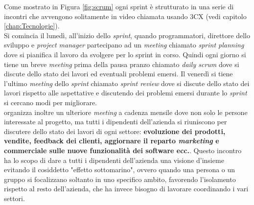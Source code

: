 Come mostrato in Figura \ref{fig:scrum} ogni sprint è strutturato in una serie di incontri che avvengono solitamente in video chiamata usando 
3CX (vedi capitolo \ref{chap:Tecnologie}).\\ 
Si comincia il lunedì, all'inizio dello \textit{sprint}, quando programmatori, direttore dello sviluppo e \textit{project manager} partecipano 
ad un \textit{meeting} chiamato \textit{sprint planning} dove si pianifica il lavoro da svolgere per lo sprint in corso.
Quindi ogni giorno si tiene un breve \textit{meeting} prima della pausa pranzo chiamato \textit{daily scrum} dove si discute dello stato dei lavori ed 
eventuali problemi emersi.
Il venerdì si tiene l'ultimo \textit{meeting} dello \textit{sprint} chiamato \textit{sprint review} dove si discute 
dello stato dei lavori rispetto alle aspettative e discutendo dei problemi emersi durante lo \textit{sprint} si cercano modi per migliorare.\\
{\company} organizza inoltre un ulteriore \textit{meeting} a cadenza mensile dove non solo le persone interessate al progetto, ma tutti i dipendenti dell'azienda 
si riuniscono per discutere dello stato dei lavori di ogni settore: \textbf{evoluzione dei prodotti, vendite, feedback dei clienti, aggiornare il reparto \textit{marketing}
 e commerciale sulle nuove funzionalità dei software ecc.}. Questo incontro ha 
lo scopo di dare a tutti i dipendenti dell'azienda una visione d'insieme evitando il cosiddetto "effetto sottomarino", ovvero quando una persona o un gruppo si focalizzano 
soltanto in uno specifico ambito, favorendo l'isolamento rispetto al resto dell'azienda, che ha invece bisogno di lavorare coordinando i vari settori.
